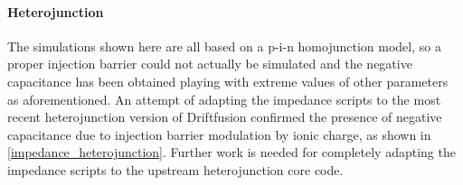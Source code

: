 \begin{figure}
\end{figure}


\paragraph{Heterojunction}
The simulations shown here are all based on a p-i-n homojunction model, so a proper injection barrier could not actually be simulated and the negative capacitance has been obtained playing with extreme values of other parameters as aforementioned.
An attempt of adapting the impedance scripts to the most recent heterojunction version of Driftfusion confirmed the presence of negative capacitance due to injection barrier modulation by ionic charge, as shown in \cref{impedance_heterojunction}.
Further work is needed for completely adapting the impedance scripts to the upstream heterojunction core code.

